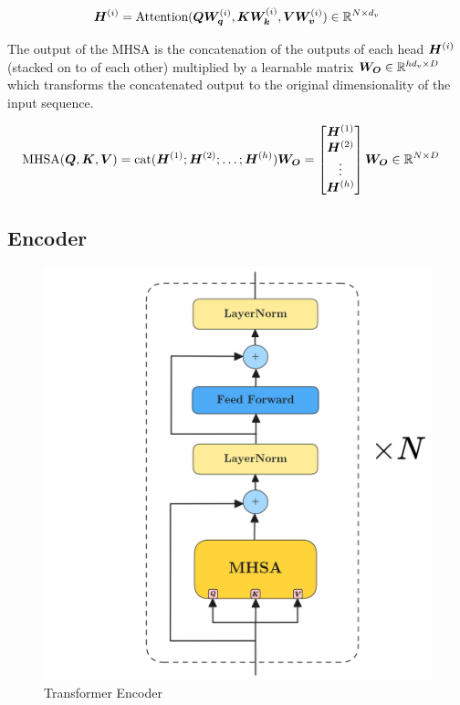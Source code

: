 \documentclass[../../main.tex]{subfiles}
\begin{document}
\begin{equation}
	\bm{H}^{(i)} = \text{Attention}(\bm{Q}\bm{W_q}^{(i)}, \bm{K}\bm{W_k}^{(i)}, \bm{V}\bm{W_v}^{(i)}) \in \mathbb{R}^{N \times d_v}
\end{equation}

The output of the MHSA is the concatenation of the outputs of each head $\bm{H}^{(i)}$ (stacked on to of each other) multiplied by a learnable matrix $\bm{W_O} \in \mathbb{R}^{hd_v \times D}$ which transforms the concatenated output to the original dimensionality of the input sequence.

\begin{align*}
	 \text{MHSA}(\bm{Q}, \bm{K}, \bm{V}) &= \text{cat}(\bm{H}^{(1)}; \bm{H}^{(2)}; \dots; \bm{H}^{(h)})\bm{W_O} 
	= \begin{bmatrix}
		\bm{H}^{(1)} \\
		\bm{H}^{(2)} \\
		\vdots \\
		\bm{H}^{(h)}
	\end{bmatrix} \bm{W_O} \in \mathbb{R}^{N \times D}
\end{align*}



\subsection{Encoder}

\begin{figure}[H]
	\centering
	\includegraphics[height=0.5\textwidth]{./encoder.png}
	\caption{Transformer Encoder \cite{vaswani2017attention}}
	\label{fig:encoder}
\end{figure}
\end{document}

